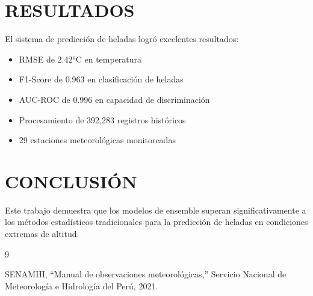 \documentclass[11pt, a4paper]{article}
\begin{document}
\section{RESULTADOS}

El sistema de predicción de heladas logró excelentes resultados:

\begin{itemize}
    \item RMSE de 2.42°C en temperatura
    \item F1-Score de 0.963 en clasificación de heladas
    \item AUC-ROC de 0.996 en capacidad de discriminación
    \item Procesamiento de 392,283 registros históricos
    \item 29 estaciones meteorológicas monitoreadas
\end{itemize}

\section{CONCLUSIÓN}

Este trabajo demuestra que los modelos de ensemble superan significativamente a los métodos estadísticos tradicionales para la predicción de heladas en condiciones extremas de altitud.

\begin{thebibliography}{9}

SENAMHI, ``Manual de observaciones meteorológicas,'' Servicio Nacional de Meteorología e Hidrología del Perú, 2021.

\end{thebibliography}
\end{document}
